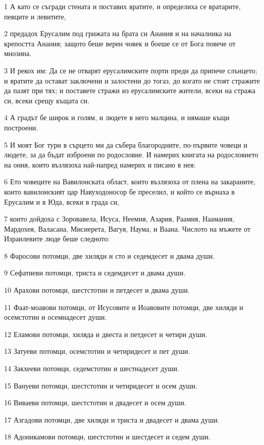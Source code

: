\par 1 А като се съгради стената и поставих вратите, и определиха се вратарите, певците и левитите,
\par 2 предадох Ерусалим под грижата на брата си Анания и на началника на крепостта Анания; защото беше верен човек и боеше се от Бога повече от мнозина.
\par 3 И рекох им: Да се не отварят ерусалимските порти преди да припече слънцето; и вратите да остават заключени и залостени до тогаз, до когато не стоят стражите да пазят при тях; и поставете стражи из ерусалимските жители, всеки на стража си, всеки срещу къщата си.
\par 4 А градът бе широк и голям, и людете в него малцина, и нямаше къщи построени.
\par 5 И моят Бог тури в сърцето ми да събера благородните, по-първите човеци и людете, за да бъдат изброени по родословие. И намерих книгата на родословието на ония, които възлязоха най-напред намерих и писано в нея:
\par 6 Ето човеците на Вавилонската област, които възлязоха от плена на закараните, които вавилонският цар Навуходоносор бе преселил, и който се върнаха в Ерусалим и в Юда, всеки в града си,
\par 7 които дойдоха с Зоровавела, Исуса, Неемия, Азария, Раамия, Наамания, Мардохея, Валасана, Мисиерета, Вагуя, Наума, и Ваана. Числото на мъжете от Израилевите люде беше следното:
\par 8 Фаросови потомци, две хиляди и сто и седемдесет и двама души.
\par 9 Сефатиеви потомци, триста и седемдесет и двама души.
\par 10 Арахови потомци, шестстотин и петдесет и двама души.
\par 11 Фаат-моавови потомци, от Исусовите и Иоавовите потомци, две хиляди и осемстотин и осемнадесет души.
\par 12 Еламови потомци, хиляда и двеста и петдесет и четири души.
\par 13 Затуеви потомци, осемстотин и четиридесет и пет души.
\par 14 Закхееви потомци, седемстотин и шестнадесет души.
\par 15 Вануеви потомци, шестстотин и четиридесет и осем души.
\par 16 Виваеви потомци, шестстотин и двадесет и осем души.
\par 17 Азгадови потомци, две хиляди и триста и двадесет и двама души.
\par 18 Адоникамови потомци, шестстотин и шестдесет и седем души.
